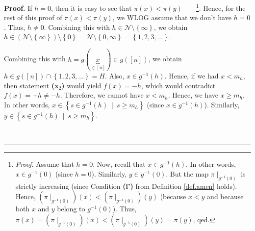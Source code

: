 \documentclass[numbers=enddot,12pt,final,onecolumn,notitlepage]{scrartcl}%
\theoremstyle{definition}
\newenvironment{proof}[1][Proof]{\noindent\textbf{#1.} }{\ \rule{0.5em}{0.5em}}
\newenvironment{verlong}{}{}
\begin{document}
\begin{verlong}
\begin{proof}
If $h=0$, then it is easy to see that $\pi\left(  x\right)  <\pi\left(
y\right)  $\ \ \ \ \footnote{\textit{Proof.} Assume that $h=0$. Now, recall
that $x\in g^{-1}\left(  h\right)  $. In other words, $x\in g^{-1}\left(
0\right)  $ (since $h=0$). Similarly, $y\in g^{-1}\left(  0\right)  $. But the
map $\pi\mid_{g^{-1}\left(  0\right)  }$ is strictly increasing (since
Condition \textbf{(i')} from Definition \ref{def.amen} holds). Hence, $\left(
\pi\mid_{g^{-1}\left(  0\right)  }\right)  \left(  x\right)  <\left(  \pi
\mid_{g^{-1}\left(  0\right)  }\right)  \left(  y\right)  $ (because $x<y$ and
because both $x$ and $y$ belong to $g^{-1}\left(  0\right)  $). Thus,
$\pi\left(  x\right)  =\left(  \pi\mid_{g^{-1}\left(  0\right)  }\right)
\left(  x\right)  <\left(  \pi\mid_{g^{-1}\left(  0\right)  }\right)  \left(
y\right)  =\pi\left(  y\right)  $, qed.}. Hence, for the rest of this proof of
$\pi\left(  x\right)  <\pi\left(  y\right)  $, we WLOG assume that we don't
have $h=0$. Thus, $h\neq0$. Combining this with $h\in\mathcal{N}%
\setminus\left\{  \infty\right\}  $, we obtain $h\in\left(  \mathcal{N}%
\setminus\left\{  \infty\right\}  \right)  \setminus\left\{  0\right\}
=\mathcal{N}\setminus\left\{  0,\infty\right\}  =\left\{  1,2,3,\ldots
\right\}  $.

Combining this with $h=g\left(  \underbrace{x}_{\in\left[  n\right]  }\right)
\in g\left(  \left[  n\right]  \right)  $, we obtain $h\in g\left(  \left[
n\right]  \right)  \cap\left\{  1,2,3,\ldots\right\}  =H$. Also, $x\in
g^{-1}\left(  h\right)  $. Hence, if we had $x<m_{h}$, then statement
\textbf{(x}$_{2}$\textbf{)} would yield $f\left(  x\right)  =-h$, which would
contradict $f\left(  x\right)  =+h\neq-h$. Therefore, we cannot have $x<m_{h}%
$. Hence, we have $x\geq m_{h}$. In other words, $x\in\left\{  s\in
g^{-1}\left(  h\right)  \ \mid\ s\geq m_{h}\right\}  $ (since $x\in
g^{-1}\left(  h\right)  $). Similarly, $y\in\left\{  s\in g^{-1}\left(
h\right)  \ \mid\ s\geq m_{h}\right\}  $.


\end{proof}
\end{verlong}
\end{document}
